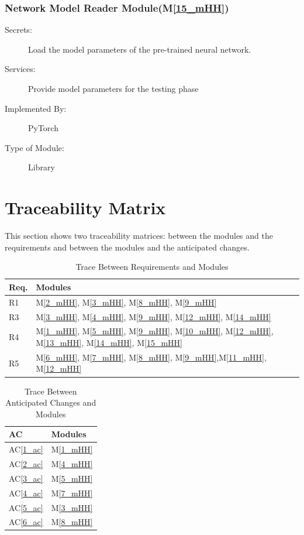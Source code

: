 \documentclass[12pt, titlepage]{article}
\newcommand{\acref}[1]{AC\ref{#1}}
\newcommand{\mref}[1]{M\ref{#1}}
\begin{document}
\subsubsection{Network Model Reader Module(\mref{15_mHH})}
\begin{description}
\item[Secrets:]Load the model parameters of the pre-trained neural network.
\item[Services:] Provide model parameters for the testing phase
\item[Implemented By:] PyTorch
\item[Type of Module:] Library
\end{description}





\section{Traceability Matrix} \label{SecTM}

This section shows two traceability matrices: between the modules and the requirements and between the modules and the anticipated changes.

\begin{table}[H]
\centering
\begin{tabular}{p{} p{}}
\toprule
\textbf{Req.} & \textbf{Modules}\\
\midrule
R1 & \mref{2_mHH}, \mref{3_mHH}, \mref{8_mHH}, \mref{9_mHH}\\
R3 & \mref{3_mHH}, \mref{4_mHH}, \mref{9_mHH}, \mref{12_mHH}, \mref{14_mHH}\\
R4 & \mref{1_mHH}, \mref{5_mHH}, \mref{9_mHH}, \mref{10_mHH}, \mref{12_mHH}, \mref{13_mHH}, \mref{14_mHH}, \mref{15_mHH}\\
R5 & \mref{6_mHH}, \mref{7_mHH},  \mref{8_mHH}, \mref{9_mHH},\mref{11_mHH}, \mref{12_mHH}\\
\bottomrule
\end{tabular}
\caption{Trace Between Requirements and Modules}
\label{TblRT}
\end{table}

\begin{table}[H]
\centering
\begin{tabular}{p{} p{}}
\toprule
\textbf{AC} & \textbf{Modules}\\
\midrule
\acref{1_ac} & \mref{1_mHH}\\
\acref{2_ac} & \mref{4_mHH}\\
\acref{3_ac} & \mref{5_mHH}\\
\acref{4_ac} & \mref{7_mHH}\\
\acref{5_ac} & \mref{3_mHH}\\
\acref{6_ac} & \mref{8_mHH}\\

\bottomrule
\end{tabular}
\caption{Trace Between Anticipated Changes and Modules}
\label{TblACT}
\end{table}
\end{document}

